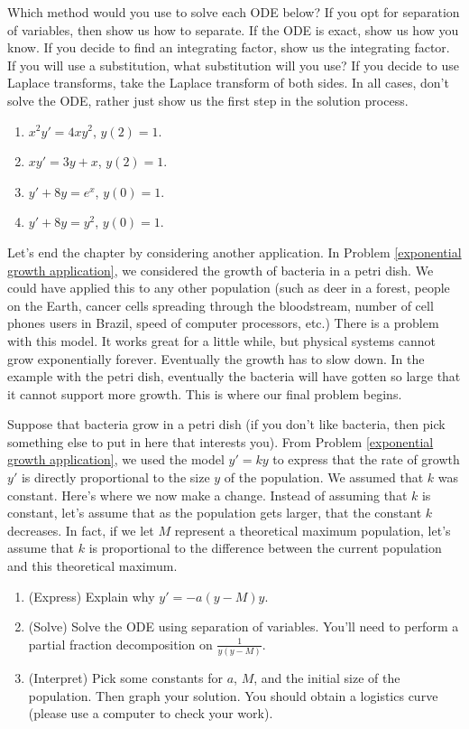 \begin{problem}
 Which method would you use to solve each ODE below? If you opt for separation of variables, then show us how to separate.  If the ODE is exact, show us how you know.  If you decide to find an integrating factor, show us the integrating factor.  If you will use a substitution, what substitution will you use? If you decide to use Laplace transforms, take the Laplace transform of both sides.  In all cases, don't solve the ODE, rather just show us the first step in the solution process.
\begin{enumerate}
 \item $x^2y'=4xy^2$, $y(2)=1$.
 \item $xy'=3y+x$, $y(2)=1$.
 \item $y'+8y=e^x$, $y(0)=1$.
 \item $y'+8y=y^2$, $y(0)=1$.
\end{enumerate}
 
\end{problem}

Let's end the chapter by considering another application. In Problem \ref{exponential growth application}, we considered the growth of bacteria in a petri dish.  We could have applied this to any other population (such as deer in a forest, people on the Earth, cancer cells spreading through the bloodstream, number of cell phones users in Brazil, speed of computer processors, etc.)  There is a problem with this model.  It works great for a little while, but physical systems cannot grow exponentially forever. Eventually the growth has to slow down.  In the example with the petri dish, eventually the bacteria will have gotten so large that it cannot support more growth. This is where our final problem begins.

\begin{problem}
 Suppose that bacteria grow in a petri dish (if you don't like bacteria, then pick something else to put in here that interests you).  From Problem \ref{exponential growth application}, we used the model $y'=ky$ to express that the rate of growth $y'$ is directly proportional to the size $y$ of the population. We assumed that $k$ was constant.  Here's where we now make a change.  Instead of assuming that $k$ is constant, let's assume that as the population gets larger, that the constant $k$ decreases. In fact, if we let $M$ represent a theoretical maximum population, let's assume that $k$ is proportional to the difference between the current population and this theoretical maximum. 
\begin{enumerate}
 \item (Express) Explain why $y'=-a(y-M)y$. 
 \item (Solve) Solve the ODE using separation of variables.  You'll need to perform a partial fraction decomposition on $\frac{1}{y(y-M)}$.
 \item (Interpret) Pick some constants for $a$, $M$, and the initial size of the population. Then graph your solution. You should obtain a logistics curve (please use a computer to check your work).
\end{enumerate}

\end{problem}

